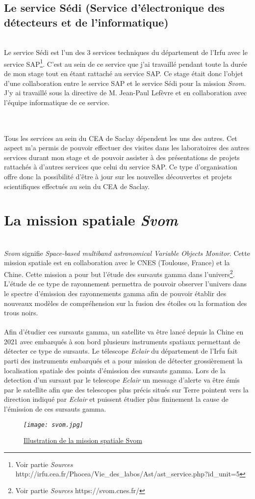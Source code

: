 \documentclass[12pt,fleqn]{book} %
\begin{document}
\subsection{Le service Sédi (Service d'électronique des détecteurs et de l'informatique)}
~\\\indent Le service Sédi est l'un des 3 services techniques du département de l'Irfu avec le service SAP\footnote{Voir partie \emph{Sources} http://irfu.cea.fr/Phocea/Vie\_des\_labos/Ast/ast\_service.php?id\_unit=5}. C'est au sein de ce service que j'ai travaillé pendant toute la durée de mon stage tout en étant rattaché au service SAP. Ce stage était donc l'objet d'une collaboration entre le service SAP et le service Sédi pour la mission \emph{Svom}. J'y ai travaillé sous la directive de M. Jean-Paul Lefèvre et en collaboration avec l'équipe informatique de ce service.

~\\\\Tous les services au sein du CEA de Saclay dépendent les uns des autres. Cet aspect m'a permis de pouvoir effectuer des visites dans les laboratoires des autres services durant mon stage et de pouvoir assister à des présentations de projets rattachés à d'autres services que celui du service SAP. Ce type d'organisation offre donc la possibilité d'être à jour sur les nouvelles découvertes et projets scientifiques effectués au sein du CEA de Saclay.

\section{La mission spatiale \emph{Svom}}
~\\\indent\emph{Svom} signifie \emph{Space-based multiband astronomical Variable Objects Monitor}. Cette mission spatiale est en collaboration avec le CNES (Toulouse, France) et la Chine. Cette mission a pour but l'étude des sursauts gamma dans l'univers\footnote{Voir partie \emph{Sources} https://svom.cnes.fr/}. L'étude de ce type de rayonnement permettra de pouvoir observer l'univers dans le spectre d'émission des rayonnements gamma afin de pouvoir établir des nouveaux modèles de compréhension sur la fusion des étoiles ou la formation des trous noirs.
~\\\\Afin d'étudier ces sursauts gamma, un satellite va être lancé depuis la Chine en 2021 avec embarqués à son bord plusieurs instruments spatiaux permettant de détecter ce type de sursauts. Le télescope \emph{Eclair} du département de l'Irfu fait parti des instruments embarqués et a pour mission de détecter grossièrement la localisation spatiale des points d'émission des sursauts gamma. Lors de la detection d'un sursaut par le telescope \emph{Eclair} un message d'alerte va être émis par le satellite afin que des telescopes plus précis situés sur Terre pointent vers la direction indiqué par \emph{Eclair} et puissent étudier plus fininement la cause de l'émission de ces sursauts gamma.
~\\
\begin{figure}[H]
	\centering
	\itshape
	\texttt{[image: svom.jpg]}
	\caption{\label{svom} \underline{Illustration de la mission spatiale Svom}}
\end{figure}
\end{document}
